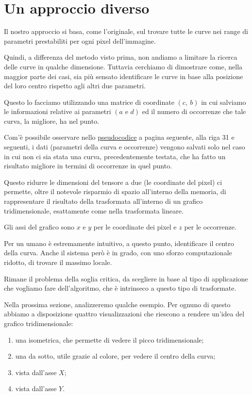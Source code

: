 \section{Un approccio diverso}
Il nostro approccio si basa, come l'originale, sul trovare tutte le curve nei range di parametri prestabiliti per ogni pixel dell'immagine.\par
Quindi, a differenza del metodo visto prima, non andiamo a limitare la ricerca delle curve in qualche dimensione. Tuttavia cerchiamo di dimostrare come, nella maggior parte dei casi, sia più sensato identificare le curve in base alla posizione del loro centro rispetto agli altri due parametri.\par
Questo lo facciamo utilizzando una matrice di coordinate $(c,\ b)$ in cui salviamo le informazioni relative ai parametri $(a \text{ e } d)$ ed il numero di occorrenze che tale curva, la migliore, ha nel punto.\par
Com'è possibile osservare nello \hyperref[lst:ostinelli]{pseudocodice} a pagina seguente, alla riga 31 e seguenti, i dati (parametri della curva e occorrenze) vengono salvati solo nel caso in cui non ci sia stata una curva, precedentemente testata, che ha fatto un risultato migliore in termini di occorrenze in quel punto.\par
Questo ridurre le dimensioni del tensore a due (le coordinate del pixel) ci permette, oltre il notevole risparmio di spazio all'interno della memoria, di rappresentare il risultato della trasformata all'interno di un grafico tridimensionale, esattamente come nella trasformata lineare.\par
Gli assi del grafico sono $x$ e $y$ per le coordinate dei pixel e $z$ per le occorrenze.\par
Per un umano è estremamente intuitivo, a questo punto, identificare il centro della curva. Anche il sistema però è in grado, con uno sforzo computazionale ridotto, di trovare il massimo locale.\par
Rimane il problema della soglia critica, da scegliere in base al tipo di applicazione che vogliamo fare dell'algoritmo, che è intrinseco a questo tipo di trasformate.\par
Nella prossima sezione, analizzeremo qualche esempio. Per ognuno di questo abbiamo a disposizione quattro visualizzazioni che riescono a rendere un'idea del grafico tridimensionale:
\begin{enumerate}[itemsep=0pt, topsep=0pt]
    \item una isometrica, che permette di vedere il picco tridimensionale;
    \item una da sotto, utile grazie al colore, per vedere il centro della curva;
    \item vista dall'asse $X$;
    \item vista dall'asse $Y$.
\end{enumerate}

